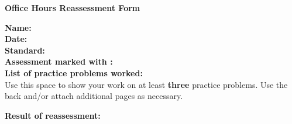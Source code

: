 
\usepackage{tbil-la}

\usepackage[top=1in,bottom=1in,left=1in,right=1in]{geometry}
\usepackage{enumerate,hyperref}
\pagestyle{empty}






\begin{center}
{\Large \bf Office Hours Reassessment Form} \\
\large \course
\end{center}



\vspace{0.2in}

\begin{flushleft}
{\bf Name: } \underline{\phantom{xxxxxxxxxxxxxxxxxxxxxxxxxxxxxxxxxxxxxxxxxxxxxxxxxxxxxxxxx}} \\
\vspace{0.15in}
{\bf Date: } \underline{\phantom{xxxxxxxxxxxxxxxxxxxxxxxxxxxxxxxxxxxxxxxxxxxxxxxxxxxxxxxxx}} \\
\vspace{0.15in}
{\bf Standard: } \underline{\phantom{xxxxxxxxxxxxxxxxxxx}} \\
\vspace{0.15in}
{\bf Assessment marked with \reattemptMark{}: } \underline{\phantom{xxxxxxxxxxxxxxxxxxxxxxxxxxxxx}} \\
\vspace{0.15in}
{\bf List of practice problems worked: } \\
\vspace{0.4in}
Use this space to show your work on at least {\bf three} practice problems.  Use the back and/or attach additional pages as necessary.

\vfill

\vspace{0.15in}
{\bf Result of reassessment: } \underline{\phantom{xxxxxxxxxxxxxxxxxxxxxxx}} \\

\end{flushleft}


